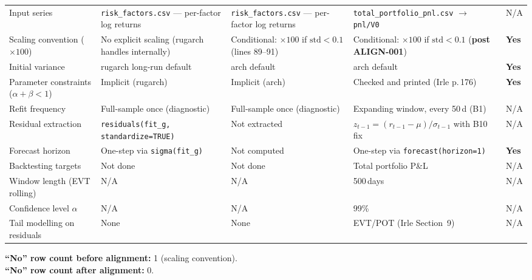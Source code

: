 \documentclass[11pt,a4paper]{article}
\newcommand{\code}[1]{\texttt{#1}}
\newcommand{\yes}{\textbf{Yes}}
\newcommand{\na}{N/A}
\begin{document}
\begin{footnotesize}
\begin{longtable}{@{}p{4.2cm} p{2.8cm} p{2.8cm} p{3.0cm} p{1.2cm}@{}}
Input series &
  \code{risk\_factors.csv} --- per-factor log returns &
  \code{risk\_factors.csv} --- per-factor log returns &
  \code{total\_portfolio\_pnl.csv} $\to$ \code{pnl/V0} &
  \na \\[3pt]

Scaling convention ($\times100$) &
  No explicit scaling (rugarch handles internally) &
  Conditional: $\times100$ if $\mathrm{std}<0.1$ (lines 89--91) &
  Conditional: $\times100$ if $\mathrm{std}<0.1$ (\textbf{post ALIGN-001}) &
  \yes \\[3pt]

Initial variance &
  rugarch long-run default &
  arch default &
  arch default &
  \yes \\[3pt]

Parameter constraints ($\alpha+\beta<1$) &
  Implicit (rugarch) &
  Implicit (arch) &
  Checked and printed (Irle p.\,176) &
  \yes \\[3pt]

Refit frequency &
  Full-sample once (diagnostic) &
  Full-sample once (diagnostic) &
  Expanding window, every 50\,d (B1) &
  \na \\[3pt]

Residual extraction &
  \code{residuals(fit\_g, standardize=TRUE)} &
  Not extracted &
  $z_{t-1} = (r_{t-1} - \mu)/\sigma_{t-1}$ with B10 fix &
  \na \\[3pt]

Forecast horizon &
  One-step via \code{sigma(fit\_g)} &
  Not computed &
  One-step via \code{forecast(horizon=1)} &
  \yes \\[3pt]

Backtesting targets &
  Not done &
  Not done &
  Total portfolio P\&L &
  \na \\[3pt]

Window length (EVT rolling) &
  \na &
  \na &
  500\,days &
  \na \\[3pt]

Confidence level $\alpha$ &
  \na &
  \na &
  99\% &
  \na \\[3pt]

Tail modelling on residuals &
  None &
  None &
  EVT/POT (Irle Section~9) &
  \na \\[3pt]

\end{longtable}
\end{footnotesize}

\medskip
\noindent\textbf{``No'' row count before alignment:} 1 (scaling convention).\\
\noindent\textbf{``No'' row count after alignment:} 0.
\end{document}
